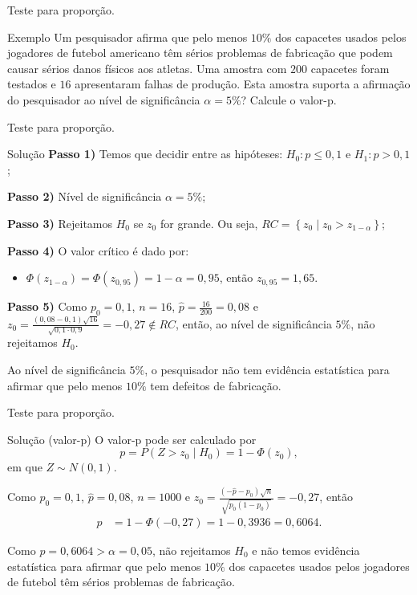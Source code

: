\documentclass[8pt]{beamer}
\begin{document}
\begin{frame}{Teste para proporção.}

\large
\begin{block}{Exemplo}
	Um pesquisador afirma que pelo menos $10\%$ dos capacetes usados pelos jogadores de futebol americano têm sérios problemas de fabricação que podem causar sérios danos físicos aos atletas. Uma amostra com $200$ capacetes foram testados e $16$ apresentaram falhas de produção. Esta amostra suporta a afirmação do pesquisador ao nível de significância $\alpha=5\%$? Calcule o valor-p.
\end{block}

\normalsize
\end{frame}

\begin{frame}{Teste para proporção.}

\begin{block}{Solução}
	\textbf{Passo 1)} Temos que decidir entre as hipóteses: $H_0: p \leq 0,1$ e $H_1: p > 0,1$;
	
	\textbf{Passo 2)} Nível de significância $\alpha=5\%$;
	
	\textbf{Passo 3)} Rejeitamos $H_0$ se $ z_0  $ for grande. Ou seja, $RC=\left\{ z_0 \mid z_0 > z_{1-\alpha} \right\}$;
	
	\textbf{Passo 4)} O valor crítico é dado por:
	\begin{itemize}
		\item $\Phi\left(z_{1-\alpha}\right) = \Phi\left(z_{0,95}\right) = 1-\alpha=0,95$, então $z_{0,95} = 1,65$.
	\end{itemize}
	
	\textbf{Passo 5)} Como $p_0=0,1$, $n=16$, $\hat{p} = \frac{16}{200} = 0,08$ e $z_0 = \frac{(0,08 - 0,1)\sqrt{16}}{\sqrt{0,1 \cdot 0,9}} = -0,27 \not\in RC$, então, ao nível de significância $5\%$, não rejeitamos $H_0$.
	
	Ao nível de significância $5\%$, o pesquisador não tem evidência estatística para afirmar que pelo menos $10\%$ tem defeitos de fabricação.
\end{block}

\end{frame}

\begin{frame}{Teste para proporção.}

\large
\begin{block}{Solução (valor-p)}
	O valor-p pode ser calculado por
	$$p=P\left( Z > z_0  \mid H_0 \right) = 1 - \Phi\left(z_0\right),$$
	em que $Z\sim N(0,1)$.
	
	Como $p_0=0,1$, $\hat{p} = 0,08$, $n=1000$ e $z_0=\frac{(-\hat{p} - p_0)\sqrt{n}}{\sqrt{p_0(1-p_0)}} = -0,27$, então
	\begin{align*}
		p &= 1 - \Phi\left( -0,27 \right) = 1 - 0,3936 = 0,6064.
	\end{align*}
	
	Como $p=0,6064 > \alpha=0,05$, não rejeitamos $H_0$ e não temos evidência estatística para afirmar que pelo menos $10\%$ dos capacetes usados pelos jogadores de futebol têm sérios problemas de fabricação.
\end{block}
\normalsize

\end{frame}
\end{document}
